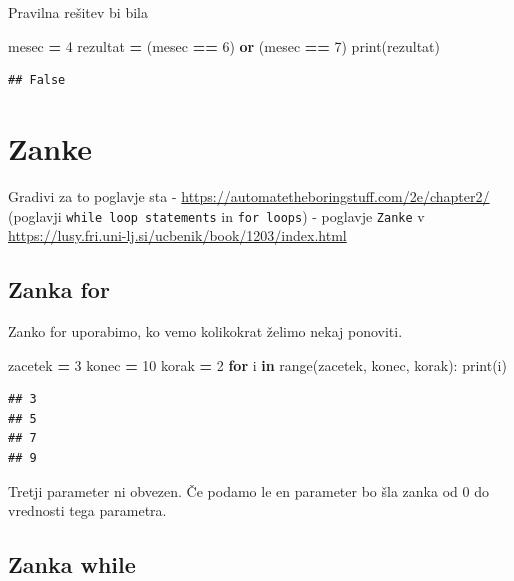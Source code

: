 \documentclass[
]{book}
\newenvironment{Shaded}{\begin{snugshade}}{\end{snugshade}}
\newcommand{\BuiltInTok}[1]{#1}
\newcommand{\ControlFlowTok}[1]{\textcolor[rgb]{0.13,0.29,0.53}{\textbf{#1}}}
\newcommand{\DecValTok}[1]{\textcolor[rgb]{0.00,0.00,0.81}{#1}}
\newcommand{\KeywordTok}[1]{\textcolor[rgb]{0.13,0.29,0.53}{\textbf{#1}}}
\newcommand{\NormalTok}[1]{#1}
\newcommand{\OperatorTok}[1]{\textcolor[rgb]{0.81,0.36,0.00}{\textbf{#1}}}
\begin{document}
Pravilna rešitev bi bila

\begin{Shaded}
\begin{Highlighting}[]
\NormalTok{mesec }\OperatorTok{=} \DecValTok{4}
\NormalTok{rezultat }\OperatorTok{=}\NormalTok{ (mesec }\OperatorTok{==} \DecValTok{6}\NormalTok{) }\KeywordTok{or}\NormalTok{ (mesec }\OperatorTok{==} \DecValTok{7}\NormalTok{)}
\BuiltInTok{print}\NormalTok{(rezultat)}
\end{Highlighting}
\end{Shaded}

\begin{verbatim}
## False
\end{verbatim}

\hypertarget{zanke}{%
\chapter{Zanke}\label{zanke}}

Gradivi za to poglavje sta
- \url{https://automatetheboringstuff.com/2e/chapter2/} (poglavji \texttt{while\ loop\ statements} in \texttt{for\ loops})
- poglavje \texttt{Zanke} v \url{https://lusy.fri.uni-lj.si/ucbenik/book/1203/index.html}

\hypertarget{zanka-for}{%
\section{Zanka for}\label{zanka-for}}

Zanko for uporabimo, ko vemo kolikokrat želimo nekaj ponoviti.

\begin{Shaded}
\begin{Highlighting}[]
\NormalTok{zacetek }\OperatorTok{=} \DecValTok{3}
\NormalTok{konec }\OperatorTok{=} \DecValTok{10}
\NormalTok{korak }\OperatorTok{=} \DecValTok{2}
\ControlFlowTok{for}\NormalTok{ i }\KeywordTok{in} \BuiltInTok{range}\NormalTok{(zacetek, konec, korak):}
    \BuiltInTok{print}\NormalTok{(i)}
\end{Highlighting}
\end{Shaded}

\begin{verbatim}
## 3
## 5
## 7
## 9
\end{verbatim}

Tretji parameter ni obvezen. Če podamo le en parameter bo šla zanka od 0 do
vrednosti tega parametra.

\hypertarget{zanka-while}{%
\section{Zanka while}\label{zanka-while}}
\end{document}
